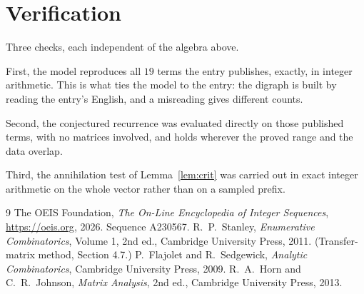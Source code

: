 \documentclass[11pt,a4paper]{article}
\theoremstyle{plain}
\theoremstyle{definition}
\begin{document}
\section{Verification}

Three checks, each independent of the algebra above.

First, the model reproduces all $19$ terms the entry publishes, exactly, in integer
arithmetic. This is what ties the model to the entry: the digraph is built by reading the
entry's English, and a misreading gives different counts.

Second, the conjectured recurrence was evaluated directly on those published terms, with no
matrices involved, and holds wherever the proved range and the data overlap.

Third, the annihilation test of Lemma~\ref{lem:crit} was carried out in exact integer
arithmetic on the whole vector rather than on a sampled prefix.

\begin{thebibliography}{9}
 The OEIS Foundation, \emph{The On-Line Encyclopedia of Integer
Sequences}, \url{https://oeis.org}, 2026. Sequence A230567.
 R.~P.~Stanley, \emph{Enumerative Combinatorics}, Volume 1, 2nd ed.,
Cambridge University Press, 2011. (Transfer-matrix method, Section 4.7.)
 P.~Flajolet and R.~Sedgewick, \emph{Analytic Combinatorics}, Cambridge
University Press, 2009.
 R.~A.~Horn and C.~R.~Johnson, \emph{Matrix Analysis}, 2nd ed., Cambridge
University Press, 2013.
\end{thebibliography}
\end{document}
